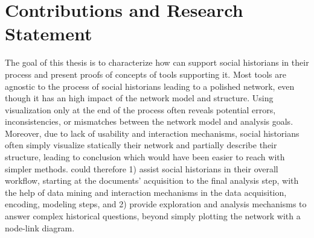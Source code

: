 


\section{Contributions and Research Statement}\label{sec:contribution-and-research-statement}

The goal of this thesis is to characterize how \va can support social historians in their \hsna process and present proofs of concepts of tools supporting it.
Most \snv tools are agnostic to the process of social historians leading to a polished network, even though it has an high impact of the network model and structure.
Using visualization only at the end of the process often reveals potential errors, inconsistencies, or mismatches between the network model and analysis goals\cite{alkadi2022}.
Moreover, due to lack of usability and interaction mechanisms, social historians often simply visualize statically their network and partially describe their structure, leading to conclusion which would have been easier to reach with simpler methods\cite{eveDeuxTraditionsAnalyse2002}.
\va could therefore 1) assist social historians in their overall workflow, starting at the documents' acquisition to the final analysis step, with the help of data mining and interaction mechanisms in the data acquisition, encoding, modeling steps, and 2) provide exploration and analysis mechanisms to answer complex historical questions, beyond simply plotting the network with a node-link diagram.

